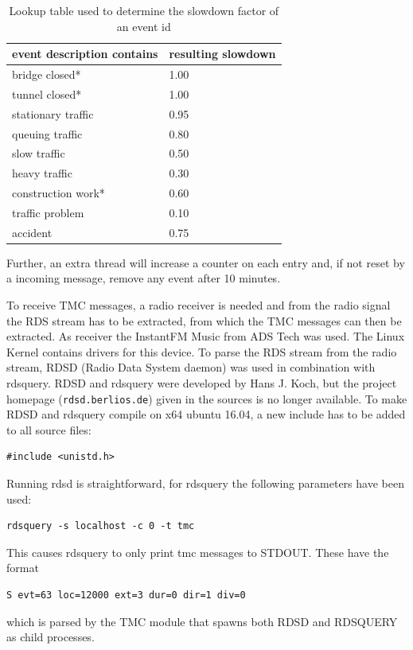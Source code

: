 \documentclass[a4paper]{scrartcl}
\begin{document}
\begin{table}
\centering
\begin{tabular}{ll}
\toprule
event description contains & resulting slowdown \\ 
\midrule
bridge closed* & 1.00\\ 
tunnel closed* & 1.00\\ 
stationary traffic & 0.95\\ 
queuing traffic & 0.80\\ 
slow traffic & 0.50\\ 
heavy traffic & 0.30\\ 
construction work* & 0.60\\ 
traffic problem & 0.10\\ 
accident & 0.75\\ 
\bottomrule
\end{tabular}
\caption{Lookup table used to determine the slowdown factor of an event id}
\label{tbl:slowdown}
\end{table}

Further, an extra thread will increase a counter on each entry and, if not reset by a incoming message, remove any event after 10 minutes. 

To receive TMC messages, a radio receiver is needed and from the radio signal the RDS stream has to be extracted, from which the TMC messages can then be extracted. As receiver the InstantFM Music from ADS Tech was used. The Linux Kernel contains drivers for this device. To parse the RDS stream from the radio stream, RDSD (Radio Data System daemon) was used in combination with rdsquery. RDSD and rdsquery were developed by Hans J. Koch, but the project homepage (\texttt{rdsd.berlios.de}) given in the sources is no longer available. To make RDSD and rdsquery compile on x64 ubuntu 16.04, a new include has to be added to all source files: 

\begin{verbatim}
#include <unistd.h>
\end{verbatim}
  
Running rdsd is straightforward, for rdsquery the following parameters have been used: 

\begin{verbatim}
rdsquery -s localhost -c 0 -t tmc
\end{verbatim}

This causes rdsquery to only print tmc messages to STDOUT. These have the format 
\begin{verbatim}
S evt=63 loc=12000 ext=3 dur=0 dir=1 div=0
\end{verbatim}
which is parsed by the TMC module that spawns both RDSD and RDSQUERY as child processes.
\end{document}

